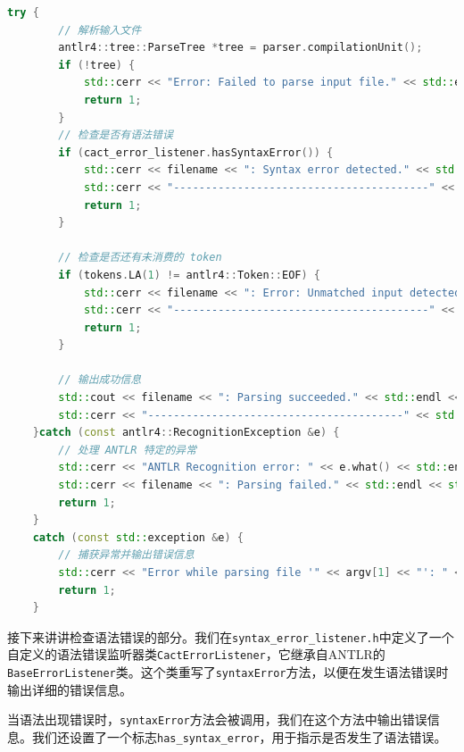 \documentclass[UTF8]{report}
\begin{document}
\begin{lstlisting}[language=C++]
    try {
        // 解析输入文件
        antlr4::tree::ParseTree *tree = parser.compilationUnit();
        if (!tree) {
            std::cerr << "Error: Failed to parse input file." << std::endl;
            return 1;
        }
        // 检查是否有语法错误
        if (cact_error_listener.hasSyntaxError()) {
            std::cerr << filename << ": Syntax error detected." << std::endl << std::endl;
            std::cerr << "----------------------------------------" << std::endl<< std::endl; // 分隔线
            return 1;
        }

        // 检查是否还有未消费的 token
        if (tokens.LA(1) != antlr4::Token::EOF) {
            std::cerr << filename << ": Error: Unmatched input detected after parsing." << std::endl << std::endl;
            std::cerr << "----------------------------------------" << std::endl<< std::endl; // 分隔线
            return 1;
        }

        // 输出成功信息
        std::cout << filename << ": Parsing succeeded." << std::endl << std::endl;
        std::cerr << "----------------------------------------" << std::endl<< std::endl; // 分隔线
    }catch (const antlr4::RecognitionException &e) {
        // 处理 ANTLR 特定的异常
        std::cerr << "ANTLR Recognition error: " << e.what() << std::endl;
        std::cerr << filename << ": Parsing failed." << std::endl << std::endl;
        return 1;
    } 
    catch (const std::exception &e) {
        // 捕获异常并输出错误信息
        std::cerr << "Error while parsing file '" << argv[1] << "': " << e.what() << std::endl << std::endl;
        return 1;
    }
\end{lstlisting}

接下来讲讲检查语法错误的部分。我们在\texttt{syntax\_error\_listener.h}中定义了一个自定义的语法错误监听器类\texttt{CactErrorListener}，它继承自ANTLR的\texttt{BaseErrorListener}类。这个类重写了\texttt{syntaxError}方法，以便在发生语法错误时输出详细的错误信息。

当语法出现错误时，\texttt{syntaxError}方法会被调用，我们在这个方法中输出错误信息。我们还设置了一个标志\texttt{has\_syntax\_error}，用于指示是否发生了语法错误。
\end{document}
